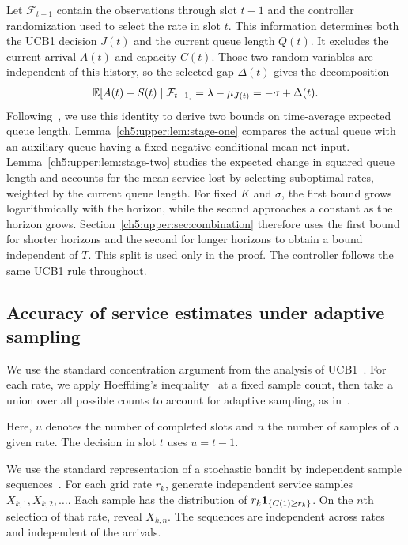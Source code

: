 Let $\mathcal F_{t-1}$ contain the observations through slot $t-1$ and
the controller randomization used to select the rate in slot $t$.
This information determines both the UCB1 decision $J(t)$ and the
current queue length $Q(t)$. It excludes the current arrival $A(t)$
and capacity $C(t)$. Those two random variables are independent of
this history, so the selected gap $\Delta(t)$ gives the decomposition
\begin{equation}
 \mathbb{E}[A(t)-S(t)\mid\mathcal F_{t-1}]
 =\lambda-\mu_{J(t)}
 =-\sigma+\Delta(t).
 \label{ch5:upper:eq:conditional-mean}
\end{equation}
Following~\cite{Freund2023}, we use this identity to derive two bounds on
time-average expected queue length. Lemma~\ref{ch5:upper:lem:stage-one}
compares the actual queue with an auxiliary queue having a fixed negative
conditional mean net input. Lemma~\ref{ch5:upper:lem:stage-two} studies the
expected change in squared queue length and accounts for the mean service
lost by selecting suboptimal rates, weighted by the current queue length.
For fixed $K$ and $\sigma$, the first bound grows logarithmically with the
horizon, while the second approaches a constant as the horizon grows.
Section~\ref{ch5:upper:sec:combination}
therefore uses the first bound for shorter horizons and the second for
longer horizons to obtain a bound independent of $T$. This split is used
only in the proof. The controller follows the same UCB1 rule throughout.


\subsection{Accuracy of service estimates under adaptive sampling}
\label{ch5:upper:sec:concentration}

We use the standard concentration argument from the analysis of
UCB1~\cite{Auer2002FinitetimeAO}. For each rate, we apply Hoeffding's
inequality~\cite{hoeffding1963probability} at a fixed sample count,
then take a union over all possible counts to account for adaptive
sampling, as in~\cite[Lemma~3.5]{Freund2025transient}.

Here, $u$ denotes the number of completed slots and $n$ the number
of samples of a given rate. The decision in slot $t$ uses $u=t-1$.

We use the standard representation of a stochastic bandit by independent
sample sequences~\cite[Section~4.6]{lattimore2020bandit}. For each grid
rate $r_k$, generate independent service samples $X_{k,1},X_{k,2},\ldots$.
Each sample has the distribution of $r_k\mathbf{1}_{\{C(1)\ge r_k\}}$. On the $n$th
selection of that rate, reveal $X_{k,n}$. The sequences are independent
across rates and independent of the arrivals.

